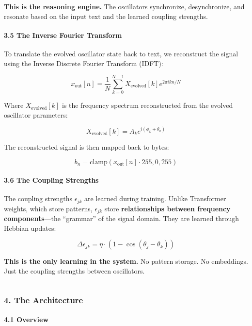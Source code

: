 \documentclass[
  11pt,
  a4paper,
]{article}
\begin{document}
\textbf{This is the reasoning engine.} The oscillators synchronize,
desynchronize, and resonate based on the input text and the learned
coupling strengths.

\paragraph{3.5 The Inverse Fourier
Transform}\label{the-inverse-fourier-transform}

To translate the evolved oscillator state back to text, we reconstruct
the signal using the Inverse Discrete Fourier Transform (IDFT):

\[
x_{\text{out}}[n] = \frac{1}{N} \sum_{k=0}^{N-1} X_{\text{evolved}}[k] e^{2\pi i k n / N}
\]

Where \(X_{\text{evolved}}[k]\) is the frequency spectrum reconstructed
from the evolved oscillator parameters:

\[
X_{\text{evolved}}[k] = A_k e^{i(\phi_k + \theta_k)}
\]

The reconstructed signal is then mapped back to bytes:

\[
b_n = \text{clamp}(x_{\text{out}}[n] \cdot 255, 0, 255)
\]

\paragraph{3.6 The Coupling Strengths}\label{the-coupling-strengths}

The coupling strengths \(\epsilon_{jk}\) are learned during training.
Unlike Transformer weights, which store patterns, \(\epsilon_{jk}\)
store \textbf{relationships between frequency components}---the
``grammar'' of the signal domain. They are learned through Hebbian
updates:

\[
\Delta \epsilon_{jk} = \eta \cdot (1 - \cos(\theta_j - \theta_k))
\]

\textbf{This is the only learning in the system.} No pattern storage. No
embeddings. Just the coupling strengths between oscillators.

\begin{center}\rule{0.5\linewidth}{0.5pt}\end{center}

\subsubsection{4. The Architecture}\label{the-architecture}

\paragraph{4.1 Overview}\label{overview-4}
\end{document}
